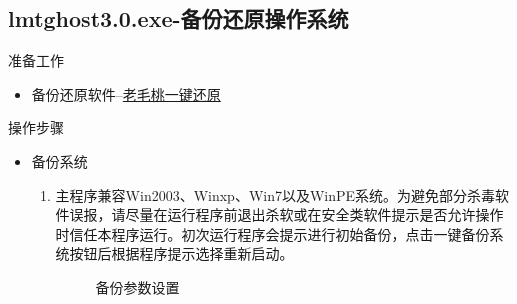 \subsection{lmtghost3.0.exe-备份还原操作系统}
准备工作
\begin{itemize}
\item 备份还原软件--\href{http://ghost.laomaotao.net/help/330/}{老毛桃一键还原}
\end{itemize} 
操作步骤
\begin{itemize}
\item 备份系统
\begin{enumerate}
\item 主程序兼容Win2003、Winxp、Win7以及WinPE系统。为避免部分杀毒软件误报，请尽量在运行程序前退出杀软或在安全类软件提示是否允许操作时信任本程序运行。初次运行程序会提示进行初始备份，点击一键备份系统按钮后根据程序提示选择重新启动。\\
\begin{figure}[!htbp]
	\centering
	\caption{备份参数设置}  

\end{figure}
\end{enumerate}
\end{itemize}

